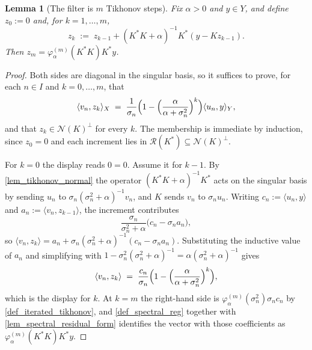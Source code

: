 \documentclass[a4paper]{report}
\theoremstyle{plain}
\newtheorem{lemma}[theorem]{Lemma}
\theoremstyle{definition}
\theoremstyle{remark}
\newcommand{\Ran}{\mathcal{R}}
\newcommand{\Ker}{\mathcal{N}}
\begin{document}
\begin{lemma}[The filter is $m$ Tikhonov steps]
  \label{lem_iterated_tikhonov_recursion}
  Fix $\alpha > 0$ and $y \in Y$, and define $z_0 := 0$ and, for $k = 1,\dots,m$,
  \[
    z_k \;:=\; z_{k-1} + (K^{*}K+\alpha)^{-1}K^{*}(y - Kz_{k-1}) .
  \]
  Then $z_m = \varphi^{(m)}_{\alpha}(K^{*}K)K^{*}y$.
\end{lemma}
\begin{proof}
  Both sides are diagonal in the singular basis, so it suffices to prove, for each
  $n \in I$ and $k = 0,\dots,m$, that
  \[
    \langle v_n, z_k\rangle_X \;=\;
      \frac{1}{\sigma_n}\Bigl(1-\Bigl(\frac{\alpha}{\alpha+\sigma_n^{2}}\Bigr)^{k}\Bigr)
      \langle u_n, y\rangle_Y ,
  \]
  and that $z_k \in \Ker(K)^{\perp}$ for every $k$.  The membership is immediate by
  induction, since $z_0 = 0$ and each increment lies in $\Ran(K^{*}) \subseteq
  \Ker(K)^{\perp}$.

  For $k = 0$ the display reads $0 = 0$.  Assume it for $k-1$.  By
  \cref{lem_tikhonov_normal} the operator $(K^{*}K+\alpha)^{-1}K^{*}$ acts on the singular
  basis by sending $u_n$ to $\sigma_n(\sigma_n^{2}+\alpha)^{-1}v_n$, and $K$ sends $v_n$
  to $\sigma_n u_n$.  Writing $c_n := \langle u_n,y\rangle$ and
  $a_n := \langle v_n, z_{k-1}\rangle$, the increment contributes
  \[
    \frac{\sigma_n}{\sigma_n^{2}+\alpha}\bigl(c_n - \sigma_n a_n\bigr) ,
  \]
  so $\langle v_n,z_k\rangle = a_n + \sigma_n(\sigma_n^{2}+\alpha)^{-1}(c_n-\sigma_na_n)$.
  Substituting the inductive value of $a_n$ and simplifying with
  $1 - \sigma_n^{2}(\sigma_n^{2}+\alpha)^{-1} = \alpha(\sigma_n^{2}+\alpha)^{-1}$ gives
  \[
    \langle v_n, z_k\rangle
      \;=\; \frac{c_n}{\sigma_n}\Bigl(1 -
        \Bigl(\frac{\alpha}{\alpha+\sigma_n^{2}}\Bigr)^{k}\Bigr) ,
  \]
  which is the display for $k$.  At $k = m$ the right-hand side is
  $\varphi^{(m)}_{\alpha}(\sigma_n^{2})\sigma_nc_n$ by \cref{def_iterated_tikhonov}, and
  \cref{def_spectral_reg} together with \cref{lem_spectral_residual_form} identifies the
  vector with those coefficients as $\varphi^{(m)}_{\alpha}(K^{*}K)K^{*}y$.
\end{proof}
\end{document}
